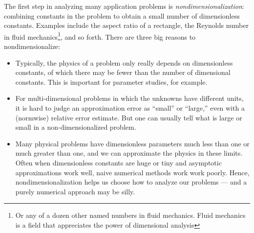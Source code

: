 The first step in analyzing many application problems is
{\em nondimensionalization}: combining constants in the
problem to obtain a small number of dimensionless constants.
Examples include the aspect ratio of a rectangle,
the Reynolds number in fluid mechanics\footnote{%
Or any of a dozen other named numbers in fluid mechanics.  Fluid
mechanics is a field that appreciates the power of dimensional
analysis}, and so forth.  There are three big reasons to
nondimensionalize:
\begin{itemize}
\item
  Typically, the physics of a problem only really depends on
  dimensionless constants, of which there may be fewer than
  the number of dimensional constants.  This is important
  for parameter studies, for example.
\item
  For multi-dimensional problems in which the unknowns have different
  units, it is hard to judge an approximation error as ``small'' or
  ``large,'' even with a (normwise) relative error estimate.  But one
  can usually tell what is large or small in a non-dimensionalized
  problem.
\item
  Many physical problems have dimensionless parameters much less than
  one or much greater than one, and we can approximate the physics in
  these limits.  Often when dimensionless constants are huge or tiny
  and asymptotic approximations work well, naive numerical methods
  work work poorly.  Hence, nondimensionalization helps us choose how
  to analyze our problems --- and a purely numerical approach may be
  silly.
\end{itemize}
